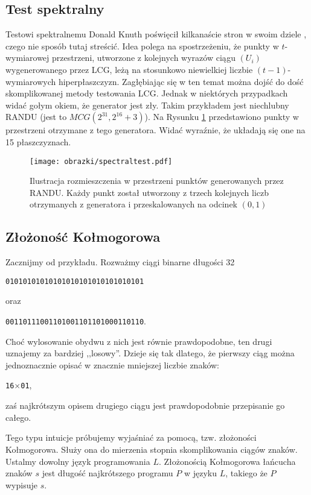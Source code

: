 \documentclass[a4paper,11pt,twoside]{book}
\theoremstyle{definition}
\newenvironment{nscenter}
 {\parskip=0pt\par\nopagebreak\centering}
 {\par\noindent\ignorespacesafterend}
\begin{document}
\subsection*{Test spektralny}
Testowi spektralnemu Donald Knuth poświęcił kilkanaście stron w swoim dziele \cite{knuth}, czego nie sposób tutaj streścić. Idea polega na spostrzeżeniu, że punkty w $t$-wymiarowej przestrzeni, utworzone z kolejnych wyrazów ciągu $(U_i)$ wygenerowanego przez LCG, leżą na stosunkowo niewielkiej liczbie $(t-1)$-wymiarowych hiperpłaszczyzn. Zagłębiając się w ten temat można dojść do dość skomplikowanej metody testowania LCG. Jednak w niektórych przypadkach widać gołym okiem, że generator jest zły. Takim przykładem jest niechlubny RANDU (jest to $MCG(2^{31}, 2^{16}+3)$). Na Rysunku \ref{fig:spectral} przedstawiono punkty w przestrzeni otrzymane z tego generatora. Widać wyraźnie, że układają się one na 15 płaszczyznach.
\begin{figure}[!ht]
 \centering
 \texttt{[image: obrazki/spectraltest.pdf]}
 \caption{Ilustracja rozmieszczenia w przestrzeni punktów generowanych przez RANDU. Każdy punkt został utworzony z trzech kolejnych liczb otrzymanych z generatora i przeskalowanych na odcinek $(0,1)$}
 \label{fig:spectral}
\end{figure}

\subsection*{Złożoność Kołmogorowa}
Zacznijmy od przykładu. Rozważmy ciągi binarne długości 32
\begin{nscenter}
\texttt{01010101010101010101010101010101} 
\end{nscenter}
oraz
\begin{nscenter}
\texttt{00110111001101001101101000110110}. 
\end{nscenter}
Choć wylosowanie obydwu z nich jest równie prawdopodobne, ten drugi uznajemy za bardziej ,,losowy''. Dzieje się tak dlatego, że pierwszy ciąg można jednoznacznie opisać w znacznie mniejszej liczbie znaków:
\begin{nscenter}
\texttt{16$\times$01},
\end{nscenter}
zaś najkrótszym opisem drugiego ciągu jest prawdopodobnie przepisanie go całego.

Tego typu intuicje próbujemy wyjaśniać za pomocą, tzw. złożoności Kołmogorowa. Służy ona do mierzenia stopnia skomplikowania ciągów znaków. Ustalmy dowolny język programowania $L$. Złożonością Kołmogorowa łańcucha znaków $s$ jest długość najkrótszego programu $P$ w języku $L$, takiego że $P$ wypisuje $s$.
\end{document}
